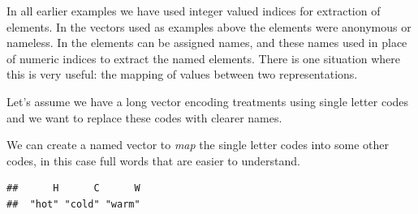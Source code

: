\documentclass[krantz2]{krantz}\usepackage{knitr}
\begin{document}
\begin{explainbox}
In all earlier examples we have used integer valued indices for extraction of elements. In the vectors used as examples above the elements were anonymous or nameless. In \Rlang the elements can be assigned names, and these names used in place of numeric indices to extract the named elements. There is one situation where this is very useful: the mapping of values between two representations.

Let's assume we have a long vector encoding treatments using single letter codes and we want to replace these codes with clearer names.

\begin{knitrout}\footnotesize
{}\color{fgcolor}\begin{kframe}
\begin{alltt}
 \hlkwb{<-} \hlstd{(}\hlstd{,} \hlstd{,} \hlstd{,} \hlstd{,} \hlstd{,} \hlstd{,} \hlstd{,} \hlstd{,} \hlstd{)}
\end{alltt}
\end{kframe}
\end{knitrout}

We can create a named vector to \emph{map} the single letter codes into some other codes, in this case full words that are easier to understand.

\begin{knitrout}\footnotesize
{}\color{fgcolor}\begin{kframe}
\begin{alltt}
 \hlkwb{<-} \hlstd{(} \hlstd{=} \hlstd{,}  \hlstd{=} \hlstd{,}  \hlstd{=} \hlstd{)}
\end{alltt}
\begin{verbatim}
##      H      C      W 
##  "hot" "cold" "warm"
\end{verbatim}
\end{kframe}
\end{knitrout}

\begin{small}
\begin{tikzpicture}[font=\sffamily,
array/.style={matrix of nodes,nodes={draw, minimum size=7mm, fill=blue!20},column sep=-\pgflinewidth, row sep=0.5mm, nodes in empty cells,
row 1/.style={nodes={draw=none, fill=none, minimum size=5mm}}}]


\end{tikzpicture}
\end{small}
\end{explainbox}
\end{document}
